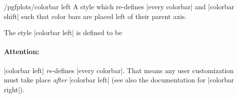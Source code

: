 \begin{stylekey}{/pgfplots/colorbar left}
	A style which re-defines |every colorbar| and |colorbar shift| such that color bars are placed left of their parent axis.
\begin{codeexample}[]
\end{codeexample}
	
	The style |colorbar left| is defined to be
\begin{codeexample}
\end{codeexample}
	\paragraph{Attention:} |colorbar left| \emph{re}-defines |every colorbar|. That means any user customization must take place \emph{after} |colorbar left| (see also the documentation for |colorbar right|).
\end{stylekey}


